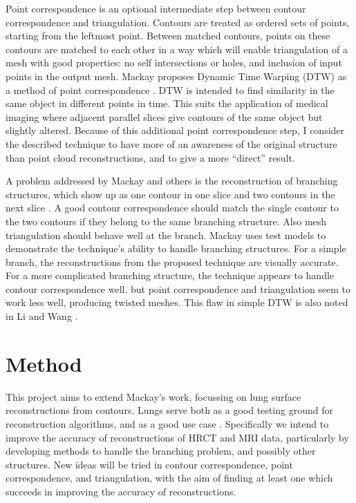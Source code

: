 \documentclass[12pt]{article}
\begin{document}
Point correspondence is an optional intermediate step between contour correspondence and triangulation. Contours are treated as ordered sets of points, starting from the leftmost point. Between matched contours, points on these contours are matched to each other in a way which will enable triangulation of a mesh with good properties: no self intersections or holes, and inclusion of input points in the output mesh. Mackay proposes Dynamic Time Warping (DTW) as a method of point correspondence \cite{mackay2019robust}. DTW is intended to find similarity in the same object in different points in time. This suits the application of medical imaging where adjacent parallel slices give contours of the same object but slightly altered. Because of this additional point correspondence step, I consider the described technique to have more of an awareness of the original structure than point cloud reconstructions, and to give a more “direct” result.

A problem addressed by Mackay and others is the reconstruction of branching structures, which show up as one contour in one slice and two contours in the next slice \cite{mackay2019robust, akkouche2004implicit}. A good contour correspondence should match the single contour to the two contours if they belong to the same branching structure. Also mesh triangulation should behave well at the branch. Mackay uses test models to demonstrate the technique’s ability to handle branching structures. For a simple branch, the reconstructions from the proposed technique are visually accurate. For a more complicated branching structure, the technique appears to handle contour correspondence well, but point correspondence and triangulation seem to work less well, producing twisted meshes. This flaw in simple DTW is also noted in Li and Wang \cite{li2021method}.

\section{Method}

This project aims to extend Mackay’s work, focussing on lung surface reconstructions from contours. Lungs serve both as a good testing ground for reconstruction algorithms, and as a good use case \cite{pluta2012new}. Specifically we intend to improve the accuracy of reconstructions of HRCT and MRI data, particularly by developing methods to handle the branching problem, and possibly other structures. New ideas will be tried in contour correspondence, point correspondence, and triangulation, with the aim of finding at least one which succeeds in improving the accuracy of reconstructions. 
\end{document}
